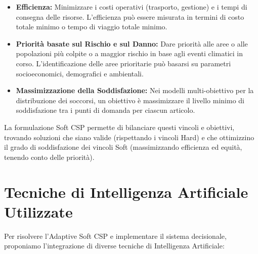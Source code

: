 \documentclass[letterpaper]{article}
\begin{document}
\begin{itemize}
\begin{itemize}
              \item \textbf{Efficienza:} Minimizzare i costi operativi (trasporto, gestione) e i tempi di consegna delle risorse. L'efficienza può essere misurata in termini di costo totale minimo o tempo di viaggio totale minimo.
              \item \textbf{Priorità basate sul Rischio e sul Danno:} Dare priorità alle aree o alle popolazioni più colpite o a maggior rischio in base agli eventi climatici in corso. L'identificazione delle aree prioritarie può basarsi su parametri socioeconomici, demografici e ambientali.
              \item \textbf{Massimizzazione della Soddisfazione:} Nei modelli multi-obiettivo per la distribuzione dei soccorsi, un obiettivo è massimizzare il livello minimo di soddisfazione tra i punti di domanda per ciascun articolo.
          \end{itemize}
\end{itemize}

La formulazione Soft CSP permette di bilanciare questi vincoli e obiettivi, trovando soluzioni che siano valide (rispettando i vincoli Hard) e che ottimizzino il grado di soddisfazione dei vincoli Soft (massimizzando efficienza ed equità, tenendo conto delle priorità).

\section{Tecniche di Intelligenza Artificiale Utilizzate}
Per risolvere l'Adaptive Soft CSP e implementare il sistema decisionale, proponiamo l'integrazione di diverse tecniche di Intelligenza Artificiale:
\end{document}
